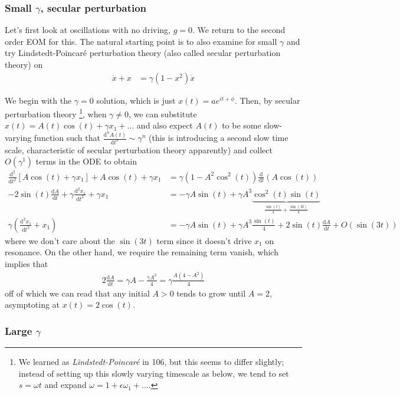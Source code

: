 \documentclass[10pt]{article}
\newcommand{\rd}[2]{\frac{\mathrm{d}#1}{\mathrm{d}#2}}
\newcommand{\rtd}[2]{\frac{\mathrm{d}^2#1}{\mathrm{d}#2^2}}
\begin{document}
\subsubsection{Small $\gamma$, secular perturbation}

Let's first look at oscillations with no driving, $g=0$. We return to the second order EOM for this. The natural starting point is to also examine for small $\gamma$ and try Lindstedt-Poincar\'e perturbation theory (also called secular perturbation theory) on
\begin{align}
    \ddot{x} + x &= \gamma(1-x^2)\dot{x}
\end{align}

We begin with the $\gamma=0$ solution, which is just $x(t) = ae^{it + \phi}$. Then, by secular perturbation theory \footnote{We learned as \emph{Lindstedt-Poincar\'e} in 106, but this seems to differ slightly; instead of setting up this slowly varying timescale as below, we tend to set $s = \omega t$ and expand $\omega = 1 + \epsilon \omega_1 +\dots$.}, when $\gamma \neq 0$, we can substitute $x(t) = A(t)\cos(t) + \gamma x_1 +\dots$ and also expect $A(t)$ to be some slow-varying function such that $\frac{\mathrm{d}^nA(t)}{\mathrm{d}t^n} \sim \gamma^n$ (this is introducing a second slow time scale, characteristic of secular perturbation theory apparently) and collect $O(\gamma^1)$ terms in the ODE to obtain
\begin{align}
    \rtd{}{t}\left[ A\cos(t) + \gamma x_1 \right] + A\cos(t) + \gamma x_1 &= \gamma(1 - A^2\cos^2(t))\rd{}{t}(A\cos(t)) \nonumber\\
    - 2\sin(t)\rd{A}{t} + \gamma\rtd{x_1}{t} + \gamma x_1 &= -\gamma A\sin(t) + \gamma A^3\underbrace{\cos^2(t)\sin(t)}_{\frac{\sin(t)}{4} + \frac{\sin(3t)}{4}} \nonumber\\
    \gamma\left(\rtd{x_1}{t} + x_1\right) &= -\gamma A\sin(t) + \gamma A^3\frac{\sin(t)}{4} + 2\sin(t)\rd{A}{t} + O(\sin(3t))
\end{align}
where we don't care about the $\sin(3t)$ term since it doesn't drive $x_1$ on resonance. On the other hand, we require the remaining term vanish, which implies that
\begin{align}
    2\rd{A}{t} = \gamma A - \frac{\gamma A^3}{4} = \gamma \frac{A(4 - A^2)}{4}
\end{align}
off of which we can read that any initial $A > 0$ tends to grow until $A = 2$, asymptoting at $x(t) = 2\cos(t)$.

\subsubsection{Large $\gamma$}
\end{document}
